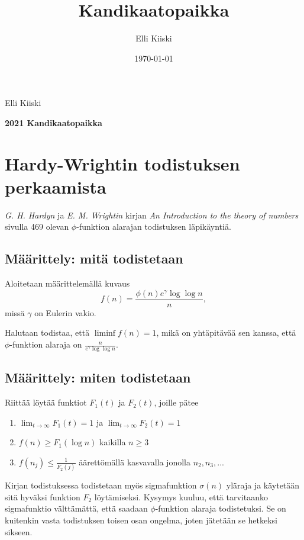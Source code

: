 \documentclass{article}
\title{Kandikaatopaikka}
\author{Elli Kiiski}
\date{\today}
\begin{document}
{\large
Elli Kiiski
\par
\textbf{2021 Kandikaatopaikka}
}
\vspace{0.5cm}

\section{Hardy-Wrightin todistuksen perkaamista}

\textit{G. H. Hardyn} ja \textit{E. M. Wrightin} kirjan \textit{An Introduction to the theory of numbers} sivulla 469 olevan $\phi$-funktion alarajan todistuksen läpikäyntiä.

\subsection{Määrittely: mitä todistetaan}

Aloitetaan määrittelemällä kuvaus
\begin{equation*}
    f(n)= \frac{\phi(n)e^\gamma \log\log n}{n},
\end{equation*}
missä $\gamma$ on Eulerin vakio.


Halutaan todistaa, että $\liminf f(n)=1$, mikä on yhtäpitävää sen kanssa, että $\phi$-funktion alaraja on $\frac{n}{e^\gamma \log\log n}$.

\subsection{Määrittely: miten todistetaan}

Riittää löytää funktiot $F_1(t)$ ja $F_2(t)$, joille pätee
\begin{enumerate}
\label{ehdot}
    \item $\lim_{t\rightarrow \infty} F_1(t) = 1$ ja $\lim_{t\rightarrow \infty} F_2(t) = 1$
    \item $f(n) \geq F_1(\log n)$ kaikilla $n\geq 3$
    \item $f(n_j) \leq \frac{1}{F_2(j)}$ äärettömällä kasvavalla jonolla $n_2, n_3,...$
\end{enumerate}


Kirjan todistuksessa todistetaan myös sigmafunktion $\sigma(n)$ yläraja ja käytetään sitä hyväksi funktion $F_2$ löytämiseksi. Kysymys kuuluu, että tarvitaanko sigmafunktio välttämättä, että saadaan $\phi$-funktion alaraja todistetuksi. Se on kuitenkin vasta todistuksen toisen osan ongelma, joten jätetään se hetkeksi sikseen.
\end{document}
